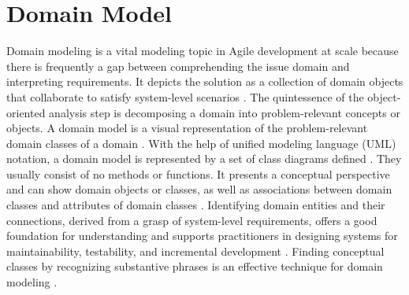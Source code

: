\section{Domain Model}
Domain modeling is a vital modeling topic in Agile development at scale because there is frequently a gap between comprehending the issue domain and interpreting requirements. It depicts the solution as a collection of domain objects that collaborate to satisfy system-level scenarios \cite{.safe}. The quintessence of the object-oriented analysis step is decomposing a domain into problem-relevant concepts or objects. A domain model is a visual representation of the problem-relevant domain classes of a domain \cite{.safe}. With the help of unified modeling language (UML) notation, a domain model is represented by a set of class diagrams defined \cite{.domainmodel}. They usually consist of no methods or functions. It presents a conceptual perspective and can show domain objects or classes, as well as associations between domain classes and attributes of domain classes \cite{.safe} \cite{.domainmodel}. Identifying domain entities and their connections, derived from a grasp of system-level requirements, offers a good foundation for understanding and supports practitioners in designing systems for maintainability, testability, and incremental development \cite{.safe}. Finding conceptual classes by recognizing substantive phrases is an effective technique for domain modeling \cite[p. 76]{.domainmodel}.

